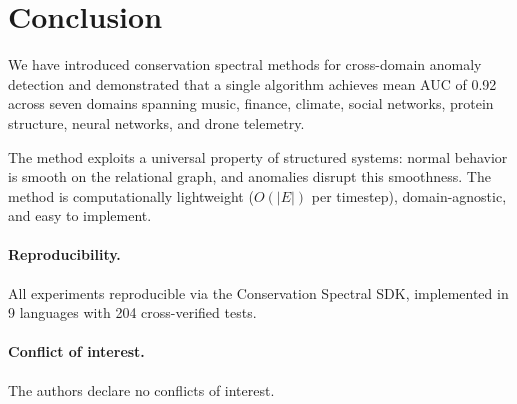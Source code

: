 \documentclass[11pt,a4paper]{article}
\begin{document}
\section{Conclusion}
\label{sec:conclusion}

We have introduced conservation spectral methods for cross-domain anomaly
detection and demonstrated that a single algorithm achieves mean AUC of 0.92
across seven domains spanning music, finance, climate, social networks,
protein structure, neural networks, and drone telemetry.

The method exploits a universal property of structured systems: normal behavior
is smooth on the relational graph, and anomalies disrupt this smoothness.  The
method is computationally lightweight ($O(|E|)$ per timestep), domain-agnostic,
and easy to implement.

\paragraph{Reproducibility.} All experiments reproducible via the Conservation
Spectral SDK, implemented in 9 languages with 204 cross-verified tests.

\paragraph{Conflict of interest.} The authors declare no conflicts of interest.
\end{document}
